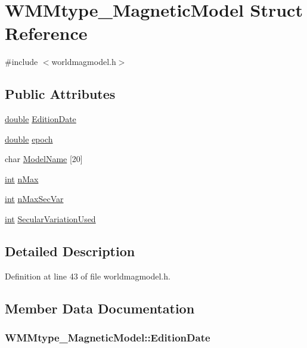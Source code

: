 \hypertarget{struct_w_m_mtype___magnetic_model}{\section{W\-M\-Mtype\-\_\-\-Magnetic\-Model Struct Reference}
\label{struct_w_m_mtype___magnetic_model}
}


{\ttfamily \#include $<$worldmagmodel.\-h$>$}

\subsection*{Public Attributes}
\begin{DoxyCompactItemize}
\item 
\hyperlink{_super_l_u_support_8h_a8956b2b9f49bf918deed98379d159ca7}{double} \hyperlink{struct_w_m_mtype___magnetic_model_a6bbf5c3bb1eed0c4178a11cc92533530}{Edition\-Date}
\item 
\hyperlink{_super_l_u_support_8h_a8956b2b9f49bf918deed98379d159ca7}{double} \hyperlink{struct_w_m_mtype___magnetic_model_ad2771cf6f5255fee58bff61029680f82}{epoch}
\item 
char \hyperlink{struct_w_m_mtype___magnetic_model_a11d5a44016770e140c397467b40c7755}{Model\-Name} \mbox{[}20\mbox{]}
\item 
\hyperlink{ioapi_8h_a787fa3cf048117ba7123753c1e74fcd6}{int} \hyperlink{struct_w_m_mtype___magnetic_model_a3cea165ace9c22b7301ac75ae8cacedb}{n\-Max}
\item 
\hyperlink{ioapi_8h_a787fa3cf048117ba7123753c1e74fcd6}{int} \hyperlink{struct_w_m_mtype___magnetic_model_a8a16d64376b1a82317aaffc2917271bb}{n\-Max\-Sec\-Var}
\item 
\hyperlink{ioapi_8h_a787fa3cf048117ba7123753c1e74fcd6}{int} \hyperlink{struct_w_m_mtype___magnetic_model_aedce5f50c04bdcf6c244f5b1845ff6f4}{Secular\-Variation\-Used}
\end{DoxyCompactItemize}


\subsection{Detailed Description}


Definition at line 43 of file worldmagmodel.\-h.



\subsection{Member Data Documentation}
\hypertarget{struct_w_m_mtype___magnetic_model_a6bbf5c3bb1eed0c4178a11cc92533530}{
\subsubsection[{Edition\-Date}]{ W\-M\-Mtype\-\_\-\-Magnetic\-Model\-::\-Edition\-Date}}\label{struct_w_m_mtype___magnetic_model_a6bbf5c3bb1eed0c4178a11cc92533530}


